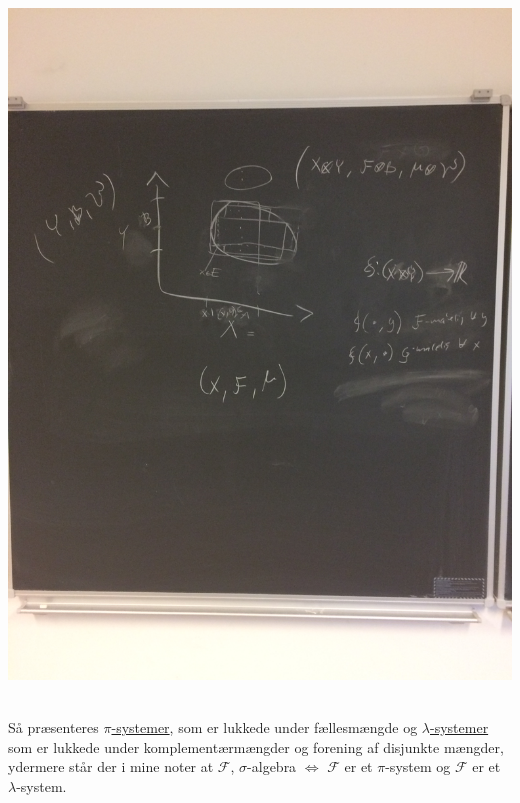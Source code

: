 \documentclass[12pt]{report}
\theoremstyle{break}
\theoremstyle{break}
\newcommand{\FI}{\mathcal{F}}
\begin{document}
\begin{minipage}[c]{\linewidth}
	\centering
	\includegraphics[scale=0.15,angle=270]{IMG_1}\label{fig:prodspace}
\end{minipage}\\[0.7 em]

Så præsenteres \href{https://en.wikipedia.org/wiki/Pi_system}{$\pi$-systemer}, som er lukkede under fællesmængde og \href{https://en.wikipedia.org/wiki/Dynkin_system}{$\lambda$-systemer} som er lukkede under komplementærmængder og forening af disjunkte mængder, ydermere står der i mine noter at $\FI$, $\sigma$-algebra $\iff$ $\FI$ er et $\pi$-system og $\FI$ er et $\lambda$-system. 
\end{document}
